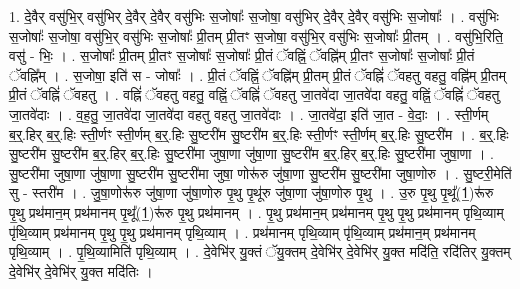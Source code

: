 \documentclass[17pt]{extarticle}
\begin{document}
1. दे॒वैर् वसु॑भि॒र् वसु॑भिर् दे॒वैर् दे॒वैर् वसु॑भिः स॒जोषाः᳚ स॒जोषा॒ वसु॑भिर् दे॒वैर् दे॒वैर् वसु॑भिः स॒जोषाः᳚ । . वसु॑भिः स॒जोषाः᳚ स॒जोषा॒ वसु॑भि॒र् वसु॑भिः स॒जोषाः᳚ प्री॒तम् प्री॒तꣳ स॒जोषा॒ वसु॑भि॒र् वसु॑भिः स॒जोषाः᳚ प्री॒तम् । . वसु॑भि॒रिति॒ वसु॑ - भिः॒ । . स॒जोषाः᳚ प्री॒तम् प्री॒तꣳ स॒जोषाः᳚ स॒जोषाः᳚ प्री॒तं ॅवह्निं॒ ॅवह्नि॑म् प्री॒तꣳ स॒जोषाः᳚ स॒जोषाः᳚ प्री॒तं ॅवह्नि᳚म् । . स॒जोषा॒ इति॑ स - जोषाः᳚ । . प्री॒तं ॅवह्निं॒ ॅवह्नि॑म् प्री॒तम् प्री॒तं ॅवह्निं॑ ॅवहतु वहतु॒ वह्नि॑म् प्री॒तम् प्री॒तं ॅवह्निं॑ ॅवहतु । . वह्निं॑ ॅवहतु वहतु॒ वह्निं॒ ॅवह्निं॑ ॅवहतु जा॒तवे॑दा जा॒तवे॑दा वहतु॒ वह्निं॒ ॅवह्निं॑ ॅवहतु जा॒तवे॑दाः । . व॒ह॒तु॒ जा॒तवे॑दा जा॒तवे॑दा वहतु वहतु जा॒तवे॑दाः । . जा॒तवे॑दा॒ इति॑ जा॒त - वे॒दाः॒ । . स्ती॒र्णम् ब॒र्॒.हिर् ब॒र्॒.हिः स्ती॒र्णꣳ स्ती॒र्णम् ब॒र्॒.हिः सु॒ष्टरी॑म सु॒ष्टरी॑म ब॒र्॒.हिः स्ती॒र्णꣳ स्ती॒र्णम् ब॒र्॒.हिः सु॒ष्टरी॑म । . ब॒र्॒.हिः सु॒ष्टरी॑म सु॒ष्टरी॑म ब॒र्॒.हिर् ब॒र्॒.हिः सु॒ष्टरी॑मा जुषा॒णा जु॑षा॒णा सु॒ष्टरी॑म ब॒र्॒.हिर् ब॒र्॒.हिः सु॒ष्टरी॑मा जुषा॒णा । . सु॒ष्टरी॑मा जुषा॒णा जु॑षा॒णा सु॒ष्टरी॑म सु॒ष्टरी॑मा जुषा॒ णोरू॑रु जु॑षा॒णा सु॒ष्टरी॑म सु॒ष्टरी॑मा जुषा॒णोरु । . सु॒ष्टरी॒मेति॑ सु - स्तरी॑म । . जु॒षा॒णोरू॑रु जु॑षा॒णा जु॑षा॒णोरु पृ॒थु पृ॒थू॑रु जु॑षा॒णा जु॑षा॒णोरु पृ॒थु । . उ॒रु पृ॒थु पृ॒थू᳚(1॒)रू॑रु पृ॒थु प्रथ॑मान॒म् प्रथ॑मानम् पृ॒थू᳚(1॒)रू॑रु पृ॒थु प्रथ॑मानम् । . पृ॒थु प्रथ॑मान॒म् प्रथ॑मानम् पृ॒थु पृ॒थु प्रथ॑मानम् पृथि॒व्याम् पृ॑थि॒व्याम् प्रथ॑मानम् पृ॒थु पृ॒थु प्रथ॑मानम् पृथि॒व्याम् । . प्रथ॑मानम् पृथि॒व्याम् पृ॑थि॒व्याम् प्रथ॑मान॒म् प्रथ॑मानम् पृथि॒व्याम् । . पृ॒थि॒व्यामिति॑ पृथि॒व्याम् । . दे॒वेभि॑र् यु॒क्तं ॅयु॒क्तम् दे॒वेभि॑र् दे॒वेभि॑र् यु॒क्त मदि॑ति॒ रदि॑तिर् यु॒क्तम् दे॒वेभि॑र् दे॒वेभि॑र् यु॒क्त मदि॑तिः । \newline
\end{document}
